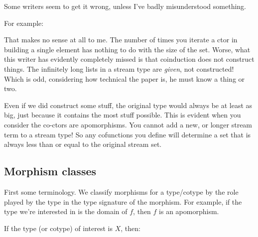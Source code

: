 \documentclass{article}
\begin{document}
Some writers seem to get it wrong, unless I've badly misunderstood something.

For example:

 That makes no sense at all to
me. The number of times you iterate a ctor in building a single
element has nothing to do with the size of the set. Worse, what this
writer has evidently completely missed is that coinduction does not
construct things. The infinitely long lists in a stream type are
\textit{given}, not constructed! Which is odd, considering how
technical the paper is, he must know a thing or two.

Even if we did construct some stuff, the original type would always be
at least as big, just because it contains the most stuff possible.
This is evident when you consider the co-ctors are apomorphisms. You
cannot add a new, or longer stream term to a stream type! So any
cofunctions you define will determine a set that is always less than
or equal to the original stream set.


\subsection{Morphism classes}\label{morph:classes}

First some terminology. We classify morphisms for a type/cotype by the
role played by the type in the type signature of the morphism. For
example, if the type we're interested in is the domain of \(f\), then
\(f\) is an apomorphism.

If the type (or cotype) of interest is \(X\), then:
\end{document}
